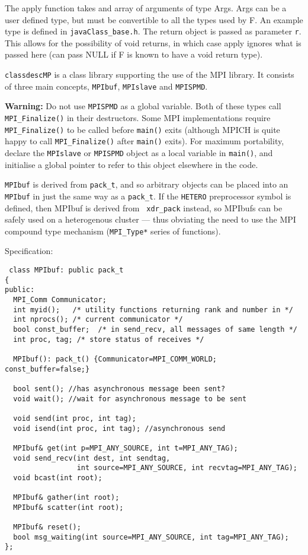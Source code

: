 The apply function takes and array of arguments of type Args. Args can
be a user defined type, but must be convertible to all the types used
by F. An example type is defined in \verb+javaClass_base.h+.
The return object is passed as parameter \verb+r+. This allows for the
possibility of void returns, in which case apply ignores what is
passed here (can pass NULL if F is known to have a void return type).


{\tt classdescMP} is a class library supporting the use of the MPI
library. It consists of three main concepts, {\tt MPIbuf},
{\tt MPIslave} and {\tt MPISPMD}.

{\bf Warning:} Do not use {\tt MPISPMD} as a global
variable. Both of these types call \verb+MPI_Finalize()+ in their
destructors. Some MPI implementations require \verb+MPI_Finalize()+ to
be called before \verb+main()+ exits (although MPICH is quite happy to
call \verb+MPI_Finalize()+ after \verb+main()+ exits). For maximum
portability, declare the {\tt MPIslave} or {\tt MPISPMD} object as a
local variable in \verb+main()+, and initialise a global pointer to
refer to this object elsewhere in the code.


{\tt MPIbuf} is derived from {\tt pack\_t}, and so
arbitrary objects can be placed into an {\tt MPIbuf} in just the same
way as a {\tt pack\_t}. If the \verb+HETERO+
preprocessor symbol is defined, then MPIbuf is derived from {\tt
xdr\_pack} instead, so MPIbufs can be safely used on
a heterogenous cluster --- thus obviating the need to use the MPI
compound type mechanism ({\tt MPI\_Type*} series of functions).

Specification:
\begin{verbatim}
 class MPIbuf: public pack_t
{
public:
  MPI_Comm Communicator;
  int myid();   /* utility functions returning rank and number in */
  int nprocs(); /* current communicator */
  bool const_buffer;  /* in send_recv, all messages of same length */
  int proc, tag; /* store status of receives */

  MPIbuf(): pack_t() {Communicator=MPI_COMM_WORLD; const_buffer=false;}

  bool sent(); //has asynchronous message been sent?
  void wait(); //wait for asynchronous message to be sent

  void send(int proc, int tag);
  void isend(int proc, int tag); //asynchronous send

  MPIbuf& get(int p=MPI_ANY_SOURCE, int t=MPI_ANY_TAG);
  void send_recv(int dest, int sendtag, 
                 int source=MPI_ANY_SOURCE, int recvtag=MPI_ANY_TAG);
  void bcast(int root);

  MPIbuf& gather(int root);
  MPIbuf& scatter(int root); 

  MPIbuf& reset();
  bool msg_waiting(int source=MPI_ANY_SOURCE, int tag=MPI_ANY_TAG);
};
\end{verbatim}


